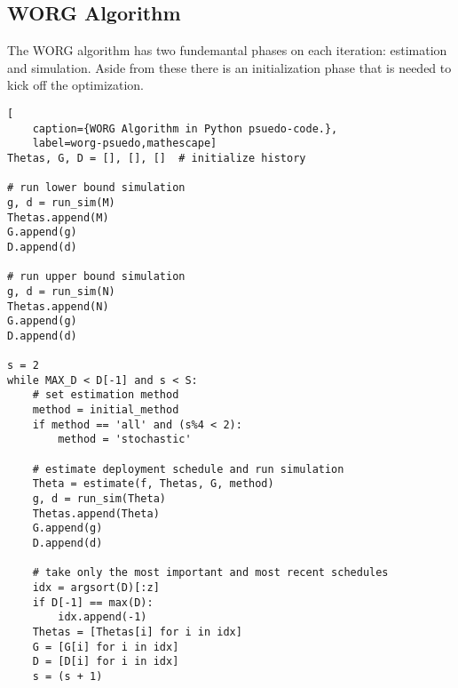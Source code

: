\subsection{WORG Algorithm}
\label{algo}

The WORG algorithm has two fundemantal phases on each iteration:
estimation and simulation.  Aside from these there is an initialization 
phase that is needed to kick off the optimization.

\clearpage
\begin{lstlisting}[
    caption={WORG Algorithm in Python psuedo-code.},
    label=worg-psuedo,mathescape]
Thetas, G, D = [], [], []  # initialize history

# run lower bound simulation
g, d = run_sim(M)
Thetas.append(M)
G.append(g)
D.append(d)

# run upper bound simulation    
g, d = run_sim(N)
Thetas.append(N)
G.append(g)
D.append(d)

s = 2
while MAX_D < D[-1] and s < S:
    # set estimation method
    method = initial_method
    if method == 'all' and (s%4 < 2):
        method = 'stochastic'

    # estimate deployment schedule and run simulation
    Theta = estimate(f, Thetas, G, method)
    g, d = run_sim(Theta)
    Thetas.append(Theta)
    G.append(g)
    D.append(d)

    # take only the most important and most recent schedules
    idx = argsort(D)[:z]
    if D[-1] == max(D):
        idx.append(-1)
    Thetas = [Thetas[i] for i in idx]
    G = [G[i] for i in idx]
    D = [D[i] for i in idx]
    s = (s + 1)
\end{lstlisting}
\clearpage
